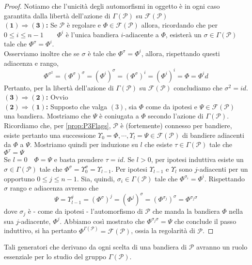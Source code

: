 \documentclass[a4paper,12pt]{report}
\newcommand{\p}{\mathcal{P}}
\theoremstyle{plain}
\theoremstyle{definition}
\newcommand\implication[2]{$\bm{(#1)\Rightarrow(#2)}$\textbf{: }}
\newcommand\flag[1]{\mathcal{F}(#1)}
\begin{document}
\begin{proof}
Notiamo che l'unicit\`a degli automorfismi in oggetto \`e in ogni caso garantita dalla libert\`a dell'azione di $\Gamma(\p)$ su $\flag{\p}$\\
\implication{1}{3}Se $\p$ \`e regolare e $\Phi\in\flag{\p}$ allora, ricordando che per $0\leq i\leq n-1\qquad\Phi^i$ \`e l'unica bandiera
$i$-adiacente a $\Phi$, esister\`a un $\sigma\in\Gamma(\p)$ tale che $\Phi^\sigma=\Phi^i$.\\
Osserviamo inoltre che se $\sigma$ \`e tale che $\Phi^\sigma=\Phi^i$, allora, rispettando questi adiacenza e rango,
\begin{equation*}
\Phi^{\sigma^2}=(\Phi^\sigma)^\sigma=(\Phi^i)^\sigma=(\Phi^\sigma)^i=(\Phi^i)^i=\Phi=\Phi^id
\end{equation*}
Pertanto, per la libert\`a dell'azione di $\Gamma(\p)$ su $\flag{\p}$ concludiamo che $\sigma^2=id$.\\
\implication{3}{2}Ovvio\\
\implication{2}{1}Supposto che valga $(3)$, sia $\Phi$ come da ipotesi e $\Psi\in\flag{\p}$ una bandiera. Mostriamo che
$\Psi$ \`e coniugata a $\Phi$ secondo l'azione di $\Gamma(\p)$.\\
Ricordiamo che, per \ref{prop:P3Flags}, $\p$ \`e (fortemente) connesso per bandiere, esiste pertanto una successione
$\Upsilon_0=\Phi,\cdots,\Upsilon_l=\Psi\in\flag{\p}$ di bandiere adiacenti da $\Phi$ a
$\Psi$. Mostriamo quindi per induzione su $l$ che esiste $\tau\in\Gamma(\p)$ tale che $\Phi^\tau=\Psi$\\
Se $l=0\quad\Phi=\Psi$ e basta prendere $\tau=id$. Se $l>0$, per ipotesi induttiva esiste un $\sigma\in\Gamma(\p)$ tale che
$\Phi^\sigma=\Upsilon_0^\sigma=\Upsilon_{l-1}$. Per ipotesi $\Upsilon_{l-1}$ e $\Upsilon_l$ sono $j$-adiacenti per un opportuno
$0\leq j\leq n-1$. Sia, quindi, $\sigma_i\in\Gamma(\p)$ tale che $\Phi^{\sigma_i}=\Phi^i$. Rispettando $\sigma$ rango e adiacenza avremo che
\begin{equation*}
\Psi=\Upsilon_{l-1}^j=(\Phi^\sigma)^j=(\Phi^j)^\sigma=(\Phi^{\sigma_j})^\sigma=\Phi^{\sigma_j\sigma}
\end{equation*}
dove $\sigma_j$ \`e - come da ipotesi - l'automorfismo di $\p$ che manda la bandiera $\Phi$ nella sua $j$-adiacente, $\Phi^j$.
Abbiamo cos\`i mostrato che $\Phi^{\sigma_j\sigma}=\Psi$ che conclude il passo induttivo, si ha pertanto
$\Phi^{\Gamma(\p)}=\flag{\p}$, ossia la regolarit\`a di $\p$.
\end{proof}
Tali generatori che derivano da ogni scelta di una bandiera di $\p$ avranno un ruolo essenziale per lo studio del gruppo $\Gamma(\p)$.
\end{document}
